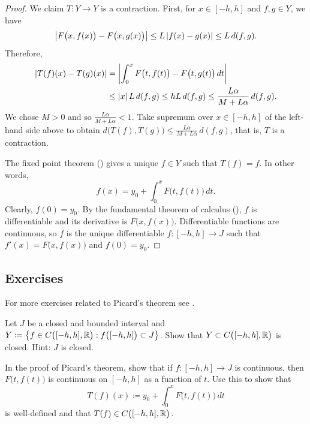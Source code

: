 \begin{proof}
We claim $T \colon Y \to Y$ is a contraction.  First, for $x \in [-h,h]$
and $f,g \in Y$, we have
\begin{equation*}
\left\lvert {F\bigl(x,f(x)\bigr) - F\bigl(x,g(x)\bigr)} \right\rvert \leq
L\left\lvert {f(x)- g(x)} \right\rvert \leq L \, d(f,g) .
\end{equation*}
Therefore,
\begin{equation*}
\begin{split}
\left\lvert {T(f)(x) - T(g)(x)} \right\rvert
&= \left\lvert {\int_0^x F\bigl(t,f(t)\bigr) - F\bigl(t,g(t)\bigr)\,dt} \right\rvert \\
& \leq \left\lvert {x} \right\rvert L \, d(f,g)
 \leq h L\, d(f,g)
 \leq \frac{L\alpha}{M+L\alpha} \, d(f,g) .
\end{split}
\end{equation*}
We chose $M > 0$ and so
$\frac{L\alpha}{M+L\alpha} < 1$.
Take supremum over $x \in [-h,h]$ of the left-hand side above to obtain
$d\bigl(T(f),T(g)\bigr) \leq \frac{L\alpha}{M+L\alpha} \, d(f,g)$,
that is, $T$ is a contraction.

The fixed point theorem ()
gives a unique $f \in Y$ such that $T(f) = f$.
In other words,
\begin{equation*} %
f(x) = y_0 + \int_0^x F\bigl(t,f(t)\bigr)\,dt .
\end{equation*}
Clearly, $f(0) = y_0$.
By the fundamental theorem of calculus (),
$f$ is differentiable and its derivative is
$F\bigl(x,f(x)\bigr)$.
Differentiable functions are continuous, so
$f$ is the unique differentiable $f \colon [-h,h] \to J$
such that
 $f'(x) = F\bigl(x,f(x)\bigr)$ and $f(0) = y_0$.
\end{proof}

\subsection{Exercises}

\begin{exnote}
For more exercises related to Picard's theorem see .
\end{exnote}

\begin{exercise}
Let $J$ be a closed and bounded interval and
$Y \coloneqq \bigl\{ f \in C\bigl([-h,h],{\mathbb{R}}\bigr) : f\bigl([-h,h]\bigr) \subset J \bigr\}$.
Show that $Y \subset C\bigl([-h,h],{\mathbb{R}}\bigr)$ is closed.  Hint: $J$ is closed.
\end{exercise}

\begin{exercise}
In the proof of Picard's theorem,
show that if $f \colon [-h,h] \to J$ is continuous, then $F\bigl(t,f(t)\bigr)$
is continuous on $[-h,h]$ as a function of $t$.  Use this to show that
\begin{equation*}
T(f)(x)
\coloneqq
y_0 + \int_0^x F\bigl(t,f(t)\bigr)\,dt
\end{equation*}
is well-defined and that $T(f) \in C\bigl([-h,h],{\mathbb{R}}\bigr)$.
\end{exercise}


